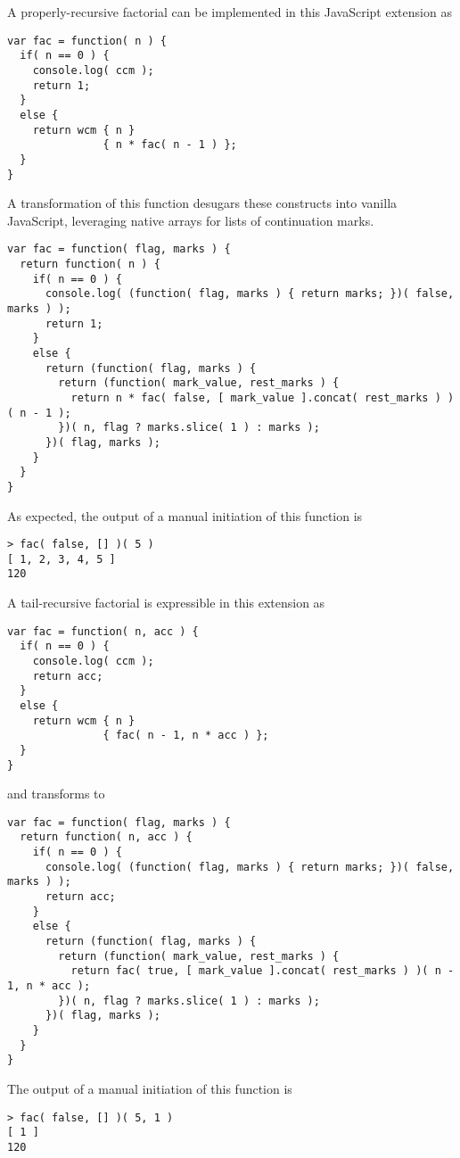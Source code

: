 \documentclass{llncs}
\begin{document}
A properly-recursive factorial can be implemented in this JavaScript extension as
\begin{verbatim}
var fac = function( n ) {
  if( n == 0 ) {
    console.log( ccm );
    return 1;
  }
  else {
    return wcm { n }
               { n * fac( n - 1 ) };
  }
}
\end{verbatim}

A transformation of this function desugars these constructs into vanilla JavaScript, leveraging native arrays for lists of continuation marks.
\begin{verbatim}
var fac = function( flag, marks ) {
  return function( n ) {
    if( n == 0 ) {
      console.log( (function( flag, marks ) { return marks; })( false, marks ) );
      return 1;
    }
    else {
      return (function( flag, marks ) {
        return (function( mark_value, rest_marks ) {
          return n * fac( false, [ mark_value ].concat( rest_marks ) )( n - 1 );
        })( n, flag ? marks.slice( 1 ) : marks );
      })( flag, marks );
    }
  }
}
\end{verbatim}

As expected, the output of a manual initiation of this function is
\begin{verbatim}
> fac( false, [] )( 5 )
[ 1, 2, 3, 4, 5 ]
120
\end{verbatim}

A tail-recursive factorial is expressible in this extension as
\begin{verbatim}
var fac = function( n, acc ) {
  if( n == 0 ) {
    console.log( ccm );
    return acc;
  }
  else {
    return wcm { n }
               { fac( n - 1, n * acc ) };
  }
}
\end{verbatim}
and transforms to
\begin{verbatim}
var fac = function( flag, marks ) {
  return function( n, acc ) {
    if( n == 0 ) {
      console.log( (function( flag, marks ) { return marks; })( false, marks ) );
      return acc;
    }
    else {
      return (function( flag, marks ) {
        return (function( mark_value, rest_marks ) {
          return fac( true, [ mark_value ].concat( rest_marks ) )( n - 1, n * acc );
        })( n, flag ? marks.slice( 1 ) : marks );
      })( flag, marks );
    }
  }
}
\end{verbatim}

The output of a manual initiation of this function is
\begin{verbatim}
> fac( false, [] )( 5, 1 )
[ 1 ]
120
\end{verbatim}
\end{document}
